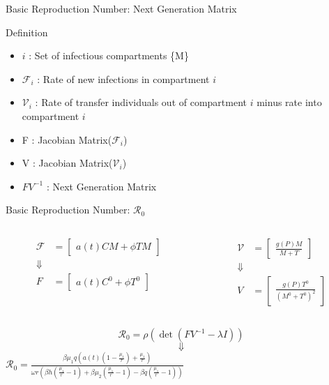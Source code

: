\documentclass{beamer}
\begin{document}
\begin{frame}{Basic Reproduction Number: Next Generation Matrix}
    \begin{block}{Definition}
        \begin{itemize}
            \item $i$ : Set of infectious compartments \{M\}
            \item $\mathscr{F}_{i}$ : Rate of new infections in compartment $i$
            \item $\mathscr{V}_{i}$ : Rate of transfer individuals out of compartment $i$ minus rate into compartment $i$
            \item F : Jacobian Matrix($\mathscr{F}_i$)
            \item V : Jacobian Matrix($\mathscr{V}_i$)
            \item $FV^{-1}$ : Next Generation Matrix
        \end{itemize}
    \end{block}
\end{frame}

\begin{frame}{Basic Reproduction Number: $\mathscr{R}_{0}$}
    \begin{columns}
        \begin{column}{0.5\textwidth}
            \begin{align*}
                \mathscr{F} &= \begin{bmatrix} a(t)CM+\phi TM \end{bmatrix}\\
                \Downarrow\\
                F &= \begin{bmatrix} a(t)C^{0} + \phi T^{0} \end{bmatrix}
            \end{align*}
        \end{column}
        \begin{column}{0.5\textwidth}
            \begin{align*}
                \mathscr{V} &= \begin{bmatrix} \frac{g(P)M}{M+T} \end{bmatrix}\\
                \Downarrow\\
                V &= \begin{bmatrix} \frac{g(P)T^{0}}{(M^{0}+T^{0})^{2}} \end{bmatrix}
            \end{align*}
        \end{column}
    \end{columns}
    $$\mathscr{R}_{0} = \rho(\det(FV^{-1} - \lambda I))$$
    $$\Downarrow$$
    \centering
    $\displaystyle {\mathscr{R}}_{0} = \frac{\beta \mu_{1}q(a(t)(1 - \frac{\mu_{1}}{r}) + \frac{\mu_{1}}{r})}{\omega r (\beta h (\frac{\mu_{1}}{r}-1) + \beta \mu_{2} (\frac{\mu_{1}}{r}-1) - \beta q(\frac{\mu_{1}}{r}-1))}$
\end{frame}
\end{document}
